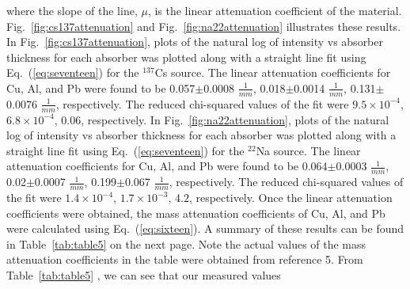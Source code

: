 \documentclass[%
 aip,
rsi,%
 amsmath,amssymb,
 reprint,%
author-numerical,%
]{revtex4-1}
\begin{document}
where the slope of the line, $\mu$, is the linear attenuation coefficient of the material. Fig.~\ref{fig:cs137attenuation} and Fig.~\ref{fig:na22attenuation} illustrates these results. \newline
\indent In Fig.~\ref{fig:cs137attenuation}, plots of the natural log of intensity vs absorber thickness for each absorber was plotted along with a straight line fit using Eq.~(\ref{eq:seventeen}) for the $^ {137 }$Cs source. The linear attenuation coefficients for Cu, Al, and Pb were found to be 0.057$\pm$0.0008 $\frac{1}{mm}$, 0.018$\pm$0.0014 $\frac{1}{mm}$, 0.131$\pm$0.0076 $\frac{1}{mm}$, respectively. The reduced chi-squared values of the fit were $9.5\times10^{-4}$, $6.8\times10^{-4}$, $0.06$, respectively. \newline 
\indent In Fig.~\ref{fig:na22attenuation}, plots of the natural log of intensity vs absorber thickness for each absorber was plotted along with a straight line fit using Eq.~(\ref{eq:seventeen}) for the $^ {22 }$Na source. The linear attenuation coefficients for Cu, Al, and Pb were found to be 0.064$\pm$0.0003 $\frac{1}{mm}$, 0.02$\pm$0.0007 $\frac{1}{mm}$, 0.199$\pm$0.067 $\frac{1}{mm}$, respectively. The reduced chi-squared values of the fit were $1.4\times10^{-4}$, $1.7\times10^{-3}$, $4.2$, respectively. \newline
\indent Once the linear attenuation coefficients were obtained, the mass attenuation coefficients of Cu, Al, and Pb were calculated using Eq.~(\ref{eq:sixteen}). A summary of these results can be found in Table~\ref{tab:table5} on the next page. Note the actual values of the mass attenuation coefficients in the table were obtained from reference 5. \newline
\indent From Table~\ref{tab:table5} , we can see that our measured values
\end{document}
